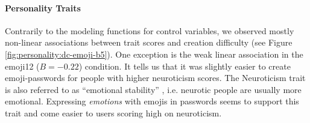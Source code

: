 {{%
	}
	\hspace{1cm}
}

\paragraph{Personality Traits}
Contrarily to the modeling functions for control variables, we observed mostly non-linear associations between trait scores and creation difficulty (see Figure \ref{fig:personality:dc-emoji-b5}).
One exception is the weak linear association in the emoji12 ($B=-0.22$) condition. It tells us that it was slightly easier to create emoji-passwords for people with higher neuroticism scores. The Neuroticism trait is also referred to as ``emotional stability'' \cite{Costa1992NEO}, i.e. neurotic people are usually more emotional. Expressing \textit{emotions} with emojis in passwords seems to support this trait and come easier to users scoring high on neuroticism. %


